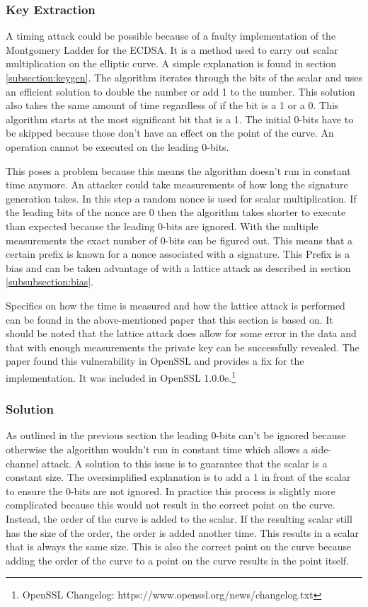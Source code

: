 \subsubsection{Key Extraction}
A timing attack could be possible because of a faulty implementation of the Montgomery Ladder for the ECDSA. It is a method used to carry out scalar multiplication on the elliptic curve. A simple explanation is found in section \ref{subsection:keygen}. The algorithm iterates through the bits of the scalar and uses an efficient solution to double the number or add 1 to the number. This solution also takes the same amount of time regardless of if the bit is a 1 or a 0. This algorithm starts at the most significant bit that is a 1. The initial 0-bits have to be skipped because those don't have an effect on the point of the curve. An operation cannot be executed on the leading 0-bits.

This poses a problem because this means the algorithm doesn't run in constant time anymore. An attacker could take measurements of how long the signature generation takes. In this step a random nonce is used for scalar multiplication. If the leading bits of the nonce are 0 then the algorithm takes shorter to execute than expected because the leading 0-bits are ignored. With the multiple measurements the exact number of 0-bits can be figured out. This means that a certain prefix is known for a nonce associated with a signature. This Prefix is a bias and can be taken advantage of with a lattice attack as described in section \ref{subsubsection:bias}.

Specifics on how the time is measured and how the lattice attack is performed can be found in the above-mentioned paper that this section is based on. It should be noted that the lattice attack does allow for some error in the data and that with enough measurements the private key can be successfully revealed. The paper found this vulnerability in OpenSSL and provides a fix for the implementation. It was included in OpenSSL 1.0.0e.\footnote{OpenSSL Changelog: https://www.openssl.org/news/changelog.txt}

\subsubsection{Solution}
As outlined in the previous section the leading 0-bits can't be ignored because otherwise the algorithm wouldn't run in constant time which allows a side-channel attack. A solution to this issue is to guarantee that the scalar is a constant size. The oversimplified explanation is to add a 1 in front of the scalar to ensure the 0-bits are not ignored. In practice this process is slightly more complicated because this would not result in the correct point on the curve. Instead, the order of the curve is added to the scalar. If the resulting scalar still has the size of the order, the order is added another time. This results in a scalar that is always the same size. This is also the correct point on the curve because adding the order of the curve to a point on the curve results in the point itself.

